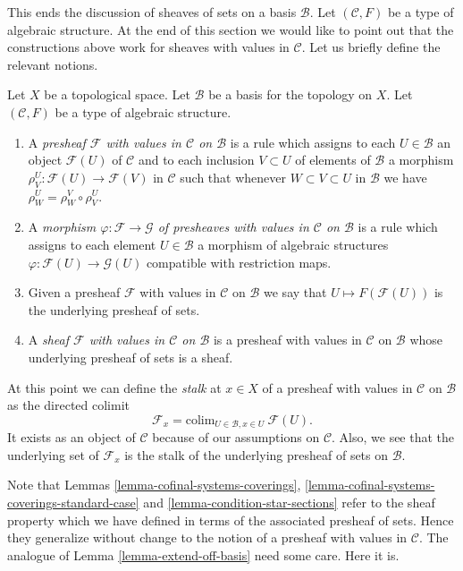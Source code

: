 \medskip\noindent
This ends the discussion of sheaves of sets on
a basis $\mathcal{B}$. Let $(\mathcal{C}, F)$ be
a type of algebraic structure. At the end of this section
we would like to point out that the constructions
above work for sheaves with values in $\mathcal{C}$.
Let us briefly define the relevant notions.

\begin{definition}
\label{definition-sheaf-structures-basis}
Let $X$ be a topological space. Let $\mathcal{B}$ be a
basis for the topology on $X$. Let $(\mathcal{C}, F)$ be
a type of algebraic structure.
\begin{enumerate}
\item A {\it presheaf $\mathcal{F}$ with values in $\mathcal{C}$
on $\mathcal{B}$} is a rule which assigns to each
$U \in \mathcal{B}$ an object
$\mathcal{F}(U)$ of $\mathcal{C}$ and to each inclusion $V \subset U$
of elements of $\mathcal{B}$ a morphism
$\rho^U_V : \mathcal{F}(U) \to \mathcal{F}(V)$  in $\mathcal{C}$ such that
whenever $W \subset V \subset U$ in $\mathcal{B}$ we have 
$\rho^U_W = \rho^V_W \circ \rho ^U_V$.
\item A {\it morphism $\varphi : \mathcal{F} \to \mathcal{G}$ 
of presheaves with values in $\mathcal{C}$
on $\mathcal{B}$} is a rule which assigns to each
element $U \in \mathcal{B}$ a morphism of
algebraic structures $\varphi : \mathcal{F}(U) \to \mathcal{G}(U)$
compatible with restriction maps.
\item Given a presheaf $\mathcal{F}$ with values in $\mathcal{C}$
on $\mathcal{B}$ we say that $U \mapsto F(\mathcal{F}(U))$ is the
underlying presheaf of sets.
\item A {\it sheaf $\mathcal{F}$ with values in $\mathcal{C}$
on $\mathcal{B}$} is a presheaf with values in $\mathcal{C}$
on $\mathcal{B}$ whose underlying presheaf of sets is a sheaf.
\end{enumerate}
\end{definition}

\noindent
At this point we can define the {\it stalk} at $x \in X$
of a presheaf with values in $\mathcal{C}$ on $\mathcal{B}$
as the directed colimit
$$
\mathcal{F}_x = \text{colim}_{U\in \mathcal{B}, x\in U}\ \mathcal{F}(U).
$$
It exists as an object of $\mathcal{C}$
because of our assumptions on $\mathcal{C}$.
Also, we see that the underlying set of $\mathcal{F}_x$
is the stalk of the underlying presheaf of sets on $\mathcal{B}$.

\medskip\noindent
Note that Lemmas \ref{lemma-cofinal-systems-coverings},
\ref{lemma-cofinal-systems-coverings-standard-case} and
\ref{lemma-condition-star-sections} refer to the sheaf
property which we have defined in terms of the associated presheaf
of sets. Hence they generalize without change to the notion
of a presheaf with values in $\mathcal{C}$. The analogue of
Lemma \ref{lemma-extend-off-basis} need some care. Here it is.

